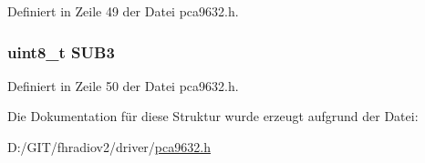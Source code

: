 Definiert in Zeile 49 der Datei pca9632.\+h.

\hypertarget{structpca9632__mode1_aec6e2f987b736f08d04b1e2026450a33}{}
\subsubsection[{S\+U\+B3}]{\setlength{\rightskip}{0pt plus 5cm}uint8\+\_\+t S\+U\+B3}\label{structpca9632__mode1_aec6e2f987b736f08d04b1e2026450a33}


Definiert in Zeile 50 der Datei pca9632.\+h.



Die Dokumentation für diese Struktur wurde erzeugt aufgrund der Datei\+:\begin{DoxyCompactItemize}
\item 
D\+:/\+G\+I\+T/fhradiov2/driver/\hyperlink{pca9632_8h}{pca9632.\+h}\end{DoxyCompactItemize}

